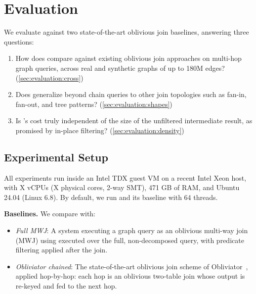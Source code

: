 \section{Evaluation}
\label{sec:evaluation}

We evaluate \system against two state-of-the-art oblivious join baselines,
answering three questions:
\begin{enumerate}[leftmargin=*]
    \item How does \system compare against existing oblivious join approaches
    on multi-hop graph queries, across real and synthetic graphs of up to
    180M edges? (\cref{sec:evaluation:cross})
    \item Does \system generalize beyond chain queries to other join
    topologies such as fan-in, fan-out, and tree patterns?
    (\cref{sec:evaluation:shapes})
    \item Is \system's cost truly independent of the size of the unfiltered
    intermediate result, as promised by in-place filtering?
    (\cref{sec:evaluation:density})
\end{enumerate}

\subsection{Experimental Setup}
\label{sec:evaluation:setup}

All experiments run inside an Intel TDX guest VM on a recent Intel Xeon host,
with X vCPUs (X physical cores, 2-way SMT), 471 GB of RAM, and Ubuntu
24.04 (Linux 6.8).  By default, we run \system and its baseline with 64 threads.

\noindent\textbf{Baselines.}
We compare \system with:
\begin{itemize}[leftmargin=*]
    \item \textit{Full MWJ}: A system executing a graph query as an oblivious multi-way join (MWJ) using
    \wei \cite{ruidi2025oblivious} executed over the full, non-decomposed
    query, with predicate filtering applied after the join.
    \item \textit{Obliviator chained}: The state-of-the-art oblivious
    join scheme of Obliviator~\cite{mavrogiannakis2025obliviator}, applied
    hop-by-hop: each hop is an oblivious two-table join whose output is
    re-keyed and fed to the next hop.

\end{itemize}

